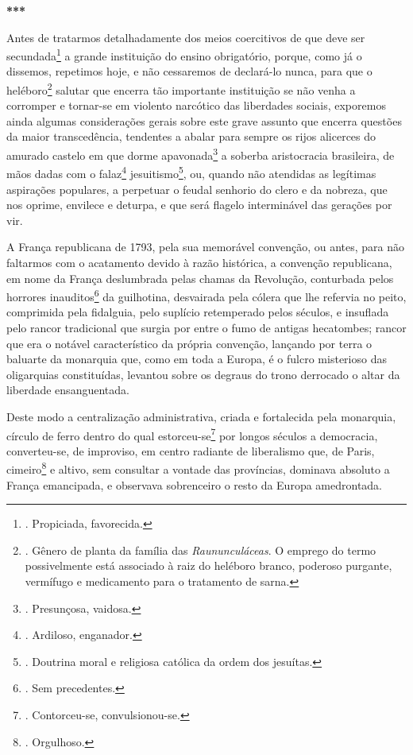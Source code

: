 \textbf{***}

Antes de tratarmos detalhadamente dos meios coercitivos de que deve ser
secundada\footnote{. Propiciada, favorecida.} a grande instituição do
ensino obrigatório, porque, como já o dissemos, repetimos hoje, e não
cessaremos de declará-lo nunca, para que o heléboro\footnote{. Gênero de
  planta da família das \emph{Raununculáceas}. O emprego do termo
  possivelmente está associado à raiz do heléboro branco, poderoso
  purgante, vermífugo e medicamento para o tratamento de sarna.} salutar
que encerra tão importante instituição se não venha a corromper e
tornar-se em violento narcótico das liberdades sociais, exporemos ainda
algumas considerações gerais sobre este grave assunto que encerra
questões da maior transcedência, tendentes a abalar para sempre os rijos
alicerces do amurado castelo em que dorme apavonada\footnote{.
  Presunçosa, vaidosa.} a soberba aristocracia brasileira, de mãos dadas
com o falaz\footnote{. Ardiloso, enganador.} jesuitismo\footnote{.
  Doutrina moral e religiosa católica da ordem dos jesuítas.}, ou,
quando não atendidas as legítimas aspirações populares, a perpetuar o
feudal senhorio do clero e da nobreza, que nos oprime, envilece e
deturpa, e que será flagelo interminável das gerações por vir.

A França republicana de 1793, pela sua memorável convenção, ou antes,
para não faltarmos com o acatamento devido à razão histórica, a
convenção republicana, em nome da França deslumbrada pelas chamas da
Revolução, conturbada pelos horrores inauditos\footnote{. Sem
  precedentes.} da guilhotina, desvairada pela cólera que lhe refervia
no peito, comprimida pela fidalguia, pelo suplício retemperado pelos
séculos, e insuflada pelo rancor tradicional que surgia por entre o fumo
de antigas hecatombes; rancor que era o notável característico da
própria convenção, lançando por terra o baluarte da monarquia que, como
em toda a Europa, é o fulcro misterioso das oligarquias constituídas,
levantou sobre os degraus do trono derrocado o altar da liberdade
ensanguentada.

Deste modo a centralização administrativa, criada e fortalecida pela
monarquia, círculo de ferro dentro do qual estorceu-se\footnote{.
  Contorceu-se, convulsionou-se.} por longos séculos a democracia,
converteu-se, de improviso, em centro radiante de liberalismo que, de
Paris, cimeiro\footnote{. Orgulhoso.} e altivo, sem consultar a vontade
das províncias, dominava absoluto a França emancipada, e observava
sobrenceiro o resto da Europa amedrontada.

